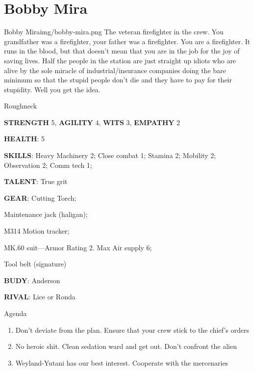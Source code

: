 
\section{Bobby Mira}

\begin{rpg-pcbox}{Bobby Mira}{img/bobby-mira.png}
    The veteran firefighter in the crew. You grandfather was a firefighter, your father was a firefighter. You are a firefighter. It runs in the blood, but that doesn't mean that you are in the job for the joy of saving lives. Half the people in the station are just straight up idiots who are alive by the sole miracle of industrial/insurance companies doing the bare minimum so that the stupid people don't die and they have to pay for their stupidity. Well you get the idea.
\end{rpg-pcbox}

\begin{rpg-commentbox}{}
    Roughneck

    \textbf{STRENGTH} 5, \textbf{AGILITY} 4, \textbf{WITS} 3, \textbf{EMPATHY} 2

    \textbf{HEALTH}: 5

    \textbf{SKILLS}: Heavy Machinery 2; Close combat 1; Stamina 2; Mobility 2; Observation 2; Comm tech 1;
    
    \textbf{TALENT}: True grit
    
    \textbf{GEAR}: Cutting Torch;
    
    Maintenance jack (haligan);
    
    M314 Motion tracker;
    
    MK.60 suit---Armor Rating 2. Max Air supply 6;  
    
    Tool belt (signature)

    
    \textbf{BUDY}: Anderson
    
    \textbf{RIVAL}: Lice or Ronda
\end{rpg-commentbox}


\begin{rpg-commentbox}{Agenda}
    \begin{enumerate}[label=\textbf{Act \arabic*}, leftmargin=1cm]
        \item Don't deviate from the plan. Ensure that your crew stick to the chief's orders 
        \item No heroic shit. Clean sedation ward and get out. Don't confront the alien
        \item Weyland-Yutani has our best interest. Cooperate with the mercenaries
    \end{enumerate}
\end{rpg-commentbox}


